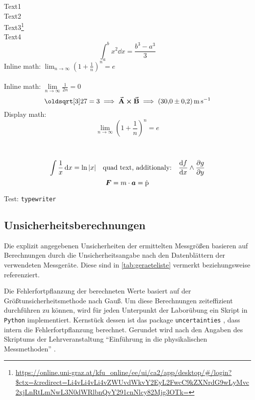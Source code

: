Text1 \cite[1000]{ref:dem1} \\
Text2 \cite[Kapitel 74]{ref:knoll} \\
Text3\footnote{\url{https://online.uni-graz.at/kfu_online/ee/ui/ca2/app/desktop/\#/login?$ctx=&redirect=Li4vLi4vLi4vZWUvdWkvY2EyL2FwcC9kZXNrdG9wLyMvc2xjLnRtLmNwL3N0dWRlbnQvY291cnNlcy82Mjg3OTk=}} \\  %
Text4 \cite{ref:genol2013}
%
\begin{equation}
    \label{eq:grenzen-oben-unten}
    \int_a^b x^2 \dd{x} =\frac{b^3-a^3}{3}  %
\end{equation}
%
Inline math: \(\lim_{n \to \infty} \left( 1 + \frac{1}{n} \right) ^{n} = e\)  \\ \\ %
Inline math: $\lim \limits_{n \to \infty} \frac{1}{2n} = 0$  %
%
\begin{displaymath}
    \sqrt[3]{27} = 3 \implies \va{A} \cross \va{B} \implies \SI{30.0(2)}{\meter\per\second}
\end{displaymath}
%
Display math: \[\lim_{n \to \infty} \left( 1 + \frac{1}{n} \right) ^{n} = e\]  \\ \\ %
\[ \int \frac{1}{x} \dd{x} = \ln|x| \qq{quad text, additionaly:} \dv{f}{x} \land \pdv{g}{y}\]  %
$$ \vb*{F} = m \cdot \vb*{a} = \dot{\text{\textup{p}}}$$  %

Test: \texttt{typewriter}

\subsection{Unsicherheitsberechnungen}
\label{subsec:unsicherheitsberechnungen}

Die explizit angegebenen Unsicherheiten der ermittelten Messgrößen basieren auf Berechnungen durch die Unsicherheitsangabe nach den Datenblättern der verwendeten Messgeräte. Diese sind in \autoref{tab:geraeteliste} vermerkt beziehungsweise referenziert.

Die Fehlerfortpflanzung der berechneten Werte basiert auf der Größtunsicherheitsmethode nach Gauß. Um diese Berechnungen zeiteffizient durchführen zu können, wird für jeden Unterpunkt der Laborübung ein Skript in \verb!Python! implementiert. Kernstück dessen ist das package \verb!uncertainties! \cite{ref:uncertainties}, dass intern die Fehlerfortpflanzung berechnet. Gerundet wird nach den Angaben des Skriptums der Lehrveranstaltung \enquote{Einführung in die physikalischen Messmethoden} \cite{ref:messmethoden}.



